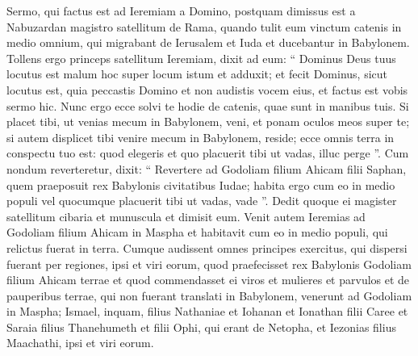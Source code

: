 \begin{biblechapter}
\begin{biblechapter}
\begin{biblechapter}
\begin{biblechapter}
\begin{biblechapter}
\begin{biblechapter}
\begin{biblechapter}
\begin{biblechapter}
\begin{biblechapter}
\begin{biblechapter}
\begin{biblechapter}
\begin{biblechapter}
\begin{biblechapter}
\begin{biblechapter}
\begin{biblechapter}
\begin{biblechapter}
\begin{biblechapter}
\begin{biblechapter}
\begin{biblechapter}
\begin{biblechapter}
\begin{biblechapter}
\begin{biblechapter}
\begin{biblechapter}
\begin{biblechapter}
\begin{biblechapter}
\begin{biblechapter}
\begin{biblechapter}
\begin{biblechapter}
\begin{biblechapter}
\begin{biblechapter}
\begin{biblechapter}
\begin{biblechapter}
\begin{biblechapter}
\begin{biblechapter}
\begin{biblechapter}
\begin{biblechapter}
\begin{biblechapter}
\begin{biblechapter}
\begin{biblechapter}
\begin{biblechapter}
\verse Sermo, qui factus est ad Ieremiam a Domino, postquam dimissus est a Nabuzardan magistro satellitum de Rama, quando tulit eum vinctum catenis in medio omnium, qui migrabant de Ierusalem et Iuda et ducebantur in Babylonem. 
 \verse Tollens ergo princeps satellitum Ieremiam, dixit ad eum: “ Dominus Deus tuus locutus est malum hoc super locum istum 
\verse et adduxit; et fecit Dominus, sicut locutus est, quia peccastis Domino et non audistis vocem eius, et factus est vobis sermo hic. 
\verse Nunc ergo ecce solvi te hodie de catenis, quae sunt in manibus tuis. Si placet tibi, ut venias mecum in Babylonem, veni, et ponam oculos meos super te; si autem displicet tibi venire mecum in Babylonem, reside; ecce omnis terra in conspectu tuo est: quod elegeris et quo placuerit tibi ut vadas, illuc perge ”. 
\verse Cum nondum reverteretur, dixit: “ Revertere ad Godoliam filium Ahicam filii Saphan, quem praeposuit rex Babylonis civitatibus Iudae; habita ergo cum eo in medio populi vel quocumque placuerit tibi ut vadas, vade ”. Dedit quoque ei magister satellitum cibaria et munuscula et dimisit eum. 
 \verse Venit autem Ieremias ad Godoliam filium Ahicam in Maspha et habitavit cum eo in medio populi, qui relictus fuerat in terra.
 \verse Cumque audissent omnes principes exercitus, qui dispersi fuerant per regiones, ipsi et viri eorum, quod praefecisset rex Babylonis Godoliam filium Ahicam terrae et quod commendasset ei viros et mulieres et parvulos et de pauperibus terrae, qui non fuerant translati in Babylonem, 
\verse venerunt ad Godoliam in Maspha; Ismael, inquam, filius Nathaniae et Iohanan et Ionathan filii Caree et Saraia filius Thanehumeth et filii Ophi, qui erant de Netopha, et Iezonias filius Maachathi, ipsi et viri eorum. 

\end{biblechapter}
\end{biblechapter}
\end{biblechapter}
\end{biblechapter}
\end{biblechapter}
\end{biblechapter}
\end{biblechapter}
\end{biblechapter}
\end{biblechapter}
\end{biblechapter}
\end{biblechapter}
\end{biblechapter}
\end{biblechapter}
\end{biblechapter}
\end{biblechapter}
\end{biblechapter}
\end{biblechapter}
\end{biblechapter}
\end{biblechapter}
\end{biblechapter}
\end{biblechapter}
\end{biblechapter}
\end{biblechapter}
\end{biblechapter}
\end{biblechapter}
\end{biblechapter}
\end{biblechapter}
\end{biblechapter}
\end{biblechapter}
\end{biblechapter}
\end{biblechapter}
\end{biblechapter}
\end{biblechapter}
\end{biblechapter}
\end{biblechapter}
\end{biblechapter}
\end{biblechapter}
\end{biblechapter}
\end{biblechapter}
\end{biblechapter}
